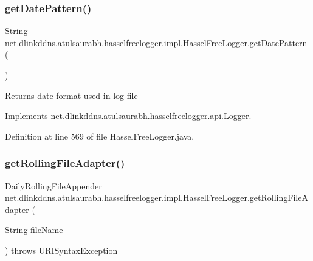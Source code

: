 \subsubsection{\texorpdfstring{get\+Date\+Pattern()}{getDatePattern()}}
{\footnotesize\ttfamily String net.\+dlinkddns.\+atulsaurabh.\+hasselfreelogger.\+impl.\+Hassel\+Free\+Logger.\+get\+Date\+Pattern (\begin{DoxyParamCaption}{ }\end{DoxyParamCaption})}

\begin{DoxyReturn}{Returns}
date format used in log file 
\end{DoxyReturn}


Implements \mbox{\hyperlink{interfacenet_1_1dlinkddns_1_1atulsaurabh_1_1hasselfreelogger_1_1api_1_1_logger_ae0413346b180ceebfe7b522ed414a8ae}{net.\+dlinkddns.\+atulsaurabh.\+hasselfreelogger.\+api.\+Logger}}.



Definition at line 569 of file Hassel\+Free\+Logger.\+java.

\mbox{\label{classnet_1_1dlinkddns_1_1atulsaurabh_1_1hasselfreelogger_1_1impl_1_1_hassel_free_logger_a33e52eaefee44a20c6146c29abf4fb3d}} 
\subsubsection{\texorpdfstring{get\+Rolling\+File\+Adapter()}{getRollingFileAdapter()}}
{\footnotesize\ttfamily Daily\+Rolling\+File\+Appender net.\+dlinkddns.\+atulsaurabh.\+hasselfreelogger.\+impl.\+Hassel\+Free\+Logger.\+get\+Rolling\+File\+Adapter (\begin{DoxyParamCaption}\item[{String}]{file\+Name }\end{DoxyParamCaption}) throws U\+R\+I\+Syntax\+Exception\hspace{0.3cm}{\ttfamily [private]}}

